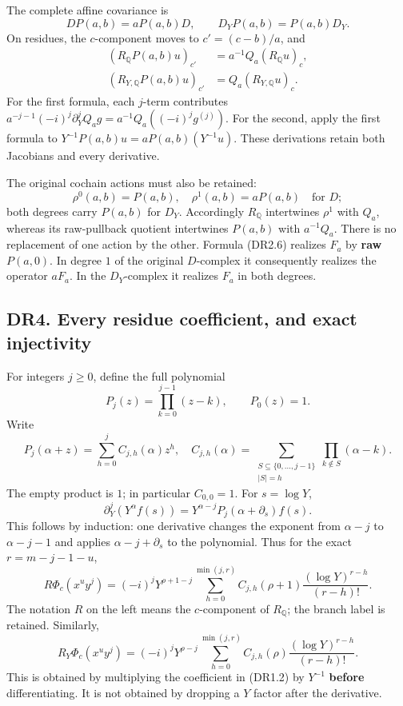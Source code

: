 The complete affine covariance is \[
 DP(a,b)=aP(a,b)D,\qquad
 D_YP(a,b)=P(a,b)D_Y.
\tag{DR3.7}
\] On residues, the \(c\)-component moves to \(c'=(c-b)/a\), and \[
 \begin{aligned}
 (R_{\mathbb Q}P(a,b)u)_{c'}
     &=a^{-1}Q_a(R_{\mathbb Q}u)_c,\\
 (R_{Y,\mathbb Q}P(a,b)u)_{c'}
     &=Q_a(R_{Y,\mathbb Q}u)_c.
 \end{aligned}
\tag{DR3.8}
\] For the first formula, each \(j\)-term contributes
\(a^{-j-1}(-i)^j\partial_Y^jQ_ag
 =a^{-1}Q_a((-i)^jg^{(j)})\). For the second, apply the first formula to
\(Y^{-1}P(a,b)u
=aP(a,b)(Y^{-1}u)\). These derivations retain both Jacobians and every
derivative.

The original cochain actions must also be retained: \[
 \rho^0(a,b)=P(a,b),\quad
 \rho^1(a,b)=aP(a,b)\quad\text{for }D;
\tag{DR3.9}
\] both degrees carry \(P(a,b)\) for \(D_Y\). Accordingly
\(R_{\mathbb Q}\) intertwines \(\rho^1\) with \(Q_a\), whereas its
raw-pullback quotient intertwines \(P(a,b)\) with \(a^{-1}Q_a\). There
is no replacement of one action by the other. Formula (DR2.6) realizes
\(F_a\) by \textbf{raw} \(P(a,0)\). In degree \(1\) of the original
\(D\)-complex it consequently realizes the operator \(aF_a\). In the
\(D_Y\)-complex it realizes \(F_a\) in both degrees.

\subsection{DR4. Every residue coefficient, and exact
injectivity}\label{dr4.-every-residue-coefficient-and-exact-injectivity}

For integers \(j\ge0\), define the full polynomial \[
 P_j(z)=\prod_{k=0}^{j-1}(z-k),\qquad P_0(z)=1.
\] Write \[
 P_j(\alpha+z)
    =\sum_{h=0}^j C_{j,h}(\alpha)z^h,
\quad
 C_{j,h}(\alpha)
    =\sum_{\substack{S\subseteq\{0,\ldots,j-1\}\\|S|=h}}
         \prod_{k\notin S}(\alpha-k).
\tag{DR4.1}
\] The empty product is \(1\); in particular \(C_{0,0}=1\). For
\(s=\log Y\), \[
 \partial_Y^j(Y^\alpha f(s))
  =Y^{\alpha-j}P_j(\alpha+\partial_s)f(s).
\tag{DR4.2}
\] This follows by induction: one derivative changes the exponent from
\(\alpha-j\) to \(\alpha-j-1\) and applies \(\alpha-j+\partial_s\) to
the polynomial. Thus for the exact \(r=m-j-1-u\), \[
 \boxed{
 R\Phi_c(x^uy^j)
  =(-i)^jY^{\rho+1-j}
       \sum_{h=0}^{\min(j,r)}
        C_{j,h}(\rho+1)
            \frac{(\log Y)^{r-h}}{(r-h)!}.
 }
\tag{DR4.3}
\] The notation \(R\) on the left means the \(c\)-component of
\(R_{\mathbb Q}\); the branch label is retained. Similarly, \[
 \boxed{
 R_Y\Phi_c(x^uy^j)
  =(-i)^jY^{\rho-j}
       \sum_{h=0}^{\min(j,r)}
        C_{j,h}(\rho)
            \frac{(\log Y)^{r-h}}{(r-h)!}.
 }
\tag{DR4.4}
\] This is obtained by multiplying the coefficient in (DR1.2) by
\(Y^{-1}\) \textbf{before} differentiating. It is not obtained by
dropping a \(Y\) factor after the derivative.

